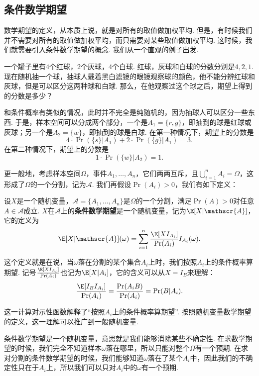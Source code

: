 \subsection{条件数学期望}\label{subsec:conditional-expectation}

数学期望的定义，从本质上说，就是对所有的取值做加权平均. 但是，有时候我们并不需要对所有的取值做加权平均，而只需要对某些取值做加权平均. 这时候，我们就需要引入条件数学期望的概念. 我们从一个直观的例子出发. 

\begin{example}
一个罐子里有$4$个红球，$2$个灰球，$4$个白球. 红球，灰球和白球的分数分别是$4,2,1$. 现在随机抽一个球，抽球人戴着黑白滤镜的眼镜观察球的颜色，他不能分辨红球和灰球，但是可以区分这两种球和白球. 那么，在他观察过这个球之后，期望上得到的分数是多少？

和条件概率有类似的情况，此时并不完全是纯随机的，因为抽球人可以区分一些东西. 于是，样本空间可以分成两个部分，一个是$A_1=\{r,g\}$，即抽到的球是红球或灰球；另一个是$A_2=\{w\}$，即抽到的球是白球. 在第一种情况下，期望上的分数是
\[4\cdot\Pr(\{s\}|A_1)+2\cdot\Pr(\{g\}|A_1)=3.\]
在第二种情况下，期望上的分数是
\[1\cdot\Pr(\{w\}|A_2)=1.\]
\end{example}

更一般地，考虑样本空间$\Omega$，事件$A_1,\dots,A_n$，它们两两互斥，且$\bigcup_{i=1}^n A_i=\Omega$，这形成了$\Omega$的一个分割，记为$\mathscr{A}$. 我们再假设$\Pr(A_i)>0$，我们有如下定义：

\begin{definition}[基于分割的条件数学期望]\label{def:conditional-expectation}
设$X$是一个随机变量，$\mathscr{A}=\{A_1,\dots,A_n\}$是$\Omega$的一个分割，满足$\Pr(A)>0$对任意$A\in\mathscr{A}$成立. $X$在$\mathscr{A}$上的\textbf{条件数学期望}是一个随机变量，记为$\E[X|\mathscr{A}]$，它的定义为
\[\E[X|\mathscr{A}](\omega)=\sum_{i=1}^n \frac{\E[XI_{A_i}]}{\Pr(A_i)}I_{A_i}(\omega).\]
\end{definition}
这个定义就是在说，当$\omega$落在分割的某个集合$A_i$上时，我们按照$A_i$上的条件概率算期望. 记号$\frac{\E[XI_{A_i}]}{\Pr(A_i)}$也记为$\E[X|A_i]$，它的含义可以从$X=I_B$来理解：
\[\frac{\E[I_{B}I_{A_i}]}{\Pr(A_i)}=\frac{\Pr(A_iB)}{\Pr(A_i)}=\Pr(B|A_i).\]

这一计算对示性函数解释了“按照$A_i$上的条件概率算期望”. 按照随机变量数学期望的定义，这一理解可以推广到一般随机变量.  

条件数学期望是一个随机变量，意思就是我们能够消除某些不确定性. 在求数学期望的时候，我们完全不知道样本$\omega$落在哪里，所以只能对整个$\Omega$有一个预期. 在求对分割的条件数学期望的时候，我们能够知道$\omega$落在了某个$A_i$中，因此我们的不确定性只在于$A_i$上，所以我们可以只对$A_i$中的$\omega$有一个预期. 

